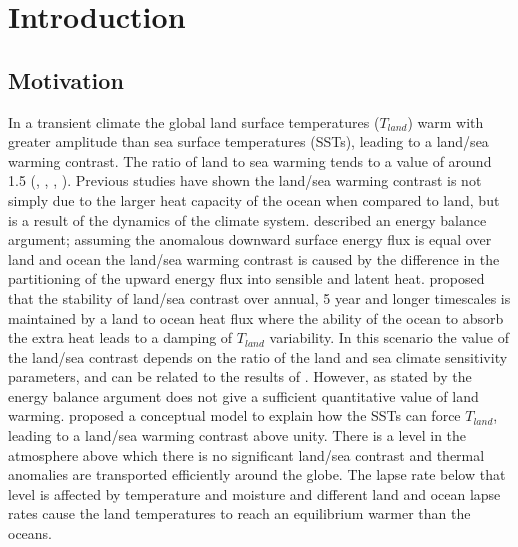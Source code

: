 \chapter{Introduction} %

\label{introduction} %



\section{Motivation}

In a transient climate the global land surface temperatures ($T_{land}$) warm 
with greater amplitude than sea surface temperatures (SSTs), leading to a 
land/sea warming contrast.  The ratio of land to sea warming tends to a value of 
around 1.5  (\citealt{Sutton2007}, \citealt{Lambert2007}, \citealt{Compo2008},
\citealt{Dommenget2009}). Previous studies have shown the land/sea warming 
contrast is not simply due to the larger heat capacity of the ocean when 
compared to land, but is a result of the dynamics of the climate system.  
\citet{Sutton2007} described an energy balance argument; assuming the anomalous 
downward surface energy flux is equal over land and ocean the land/sea warming 
contrast is caused by the difference in the partitioning of the upward energy 
flux into sensible and latent heat.  \citet*{Lambert2007} proposed that the 
stability of land/sea contrast over annual, 5 year and longer timescales is 
maintained by a land to ocean heat flux where the ability of the ocean to absorb 
the extra heat leads to a damping of $T_{land}$ variability. In this scenario 
the value of the land/sea contrast depends on the ratio of the land and sea 
climate sensitivity parameters, and can be related to the results of 
\citet{Sutton2007}.  However, as stated by \citet{Byrne2013a} the energy balance 
argument does not give a sufficient quantitative value of land warming.  
\citet{Joshi2008} proposed a conceptual model to explain how the SSTs can force 
$T_{land}$, leading to a land/sea warming contrast above unity.  There is a 
level in the atmosphere above which there is no significant land/sea contrast 
and thermal anomalies are transported efficiently around the globe. The lapse 
rate below that level is affected by temperature and moisture and different land 
and ocean lapse rates cause the land temperatures to reach an equilibrium warmer 
than the oceans.  


